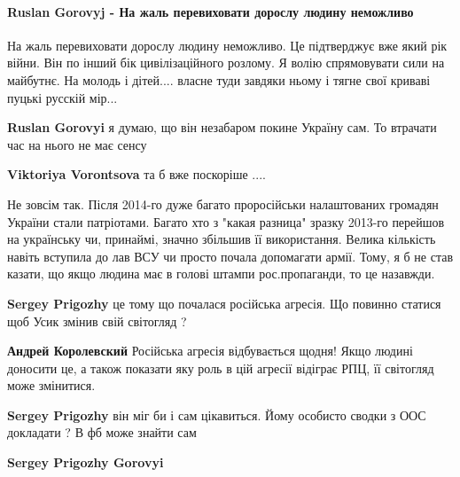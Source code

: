  
 
 
 
 
\paragraph{Ruslan Gorovyj - На жаль перевиховати дорослу людину неможливо}

\begin{itemize} %

На жаль перевиховати дорослу людину неможливо. Це підтверджує вже який рік
війни. Він по інший бік цивілізаційного розлому. Я волію спрямовувати сили на
майбутнє. На молодь і дітей.... власне туди завдяки ньому і тягне свої криваві
пуцькі русскій мір...

\begin{itemize} %
\textbf{Ruslan Gorovyi} я думаю, що він незабаром покине Україну сам. То втрачати час на нього не має сенсу

\textbf{Viktoriya Vorontsova} та б вже поскоріше ....


Не зовсім так. Після 2014-го дуже багато проросійськи налаштованих громадян
України стали патріотами. Багато хто з "какая разница" зразку 2013-го перейшов
на українську чи, принаймі, значно збільшив її використання. Велика кількість
навіть вступила до лав ВСУ чи просто почала допомагати армії. Тому, я б не став
казати, що якщо людина має в голові штампи рос.пропаганди, то це назавжди.

\textbf{Sergey Prigozhy} це тому що почалася російська агресія. Що повинно статися щоб Усик змінив свій світогляд ?

\textbf{Андрей Королевский} Російська агресія відбувається щодня! Якщо людині доносити це, а також показати яку роль в цій агресії відіграє РПЦ, її світогляд може змінитися.

\textbf{Sergey Prigozhy} він міг би і сам цікавиться. Йому особисто сводки з ООС докладати ? В фб може знайти сам

\textbf{Sergey Prigozhy Gorovyi} 


\end{itemize}
\end{itemize}
